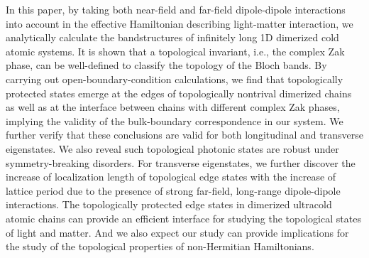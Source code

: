 \documentclass[aps,pra,reprint,groupedaddress,nofootinbib,longbibliography,showpacs]{revtex4-1}
\begin{document}
In this paper, by taking both near-field and far-field dipole-dipole interactions into account in the effective Hamiltonian describing light-matter interaction,  we analytically calculate the bandstructures of infinitely long 1D dimerized cold atomic systems. It is shown that a topological invariant, i.e., the complex Zak phase, can be well-defined to classify the topology of the Bloch bands. By carrying out open-boundary-condition calculations, we find that topologically protected states emerge at the edges of topologically nontrival dimerized chains as well as at the interface between chains with different complex Zak phases, implying the validity of the bulk-boundary correspondence in our system. We further verify that these conclusions are valid for both longitudinal and transverse eigenstates. We also reveal such topological photonic states are robust under symmetry-breaking disorders. For transverse eigenstates, we further discover the increase of localization length of topological edge states with the increase of lattice period due to the presence of strong far-field, long-range dipole-dipole interactions. The topologically protected edge states in dimerized ultracold atomic chains can provide an efficient interface for studying the topological states of light and matter. And we also expect our study can provide implications for the study of the topological properties of non-Hermitian Hamiltonians.
\end{document}
